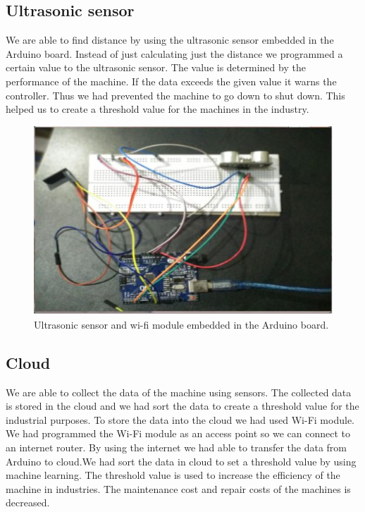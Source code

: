 \subsection{Ultrasonic sensor}
We are able to find distance by using the ultrasonic sensor embedded in the Arduino board. Instead of just calculating just the distance we programmed a certain value to the ultrasonic sensor. The value is determined by the performance of the machine. If the data exceeds the given value it warns the controller. Thus we had prevented the machine to go down to shut down. This helped us to create a threshold value for the machines in the industry.

\begin{figure}[h]
\centerline{\includegraphics[width=5.7in]{first}}
\caption{Ultrasonic sensor and wi-fi module embedded in the Arduino board.}
\end{figure}
\newpage
\subsection{Cloud}
We are able to collect the data of the machine using sensors. The collected data is stored in the cloud and we had sort the data to create a threshold value for the industrial purposes. To store the data into the cloud we had used Wi-Fi module. 
We had programmed the Wi-Fi module as an access point so we can connect to an internet router. By using the internet we had able to transfer the data from Arduino to cloud.We had sort the data in cloud to set a threshold value by using machine learning. The threshold value is used to increase the efficiency of the machine in industries. The maintenance cost and repair costs of the machines is decreased.

